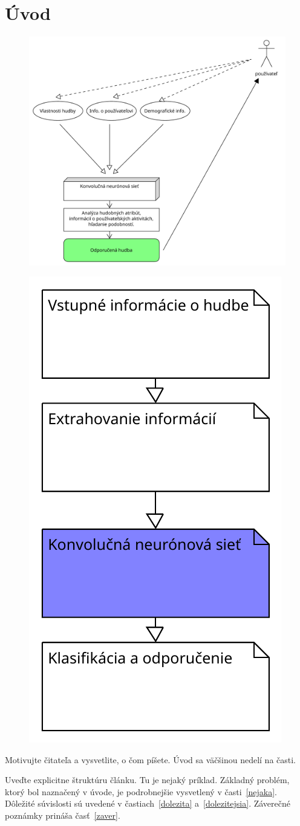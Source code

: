 \documentclass[10pt,twoside,slovak,a4paper, colorinlistoftodos]{article}
\begin{document}
\section{Úvod}

\begin{figure}
\centering
\begin{minipage}{.5\textwidth}
  \centering
  \includegraphics[width=.4\linewidth]{graf1.pdf}
  \label{fig:test1}
\end{minipage}%
\begin{minipage}{.5\textwidth}
  \centering
  \includegraphics[width=.4\linewidth]{graf2.pdf}
  \label{fig:test2}
\end{minipage}
\end{figure}

Motivujte čitateľa a vysvetlite, o čom píšete. Úvod sa väčšinou nedelí na časti.

Uveďte explicitne štruktúru článku. Tu je nejaký príklad.
Základný problém, ktorý bol naznačený v úvode, je podrobnejšie vysvetlený v časti~\ref{nejaka}.
Dôležité súvislosti sú uvedené v častiach~\ref{dolezita} a~\ref{dolezitejsia}.
Záverečné poznámky prináša časť~\ref{zaver}.
\end{document}
